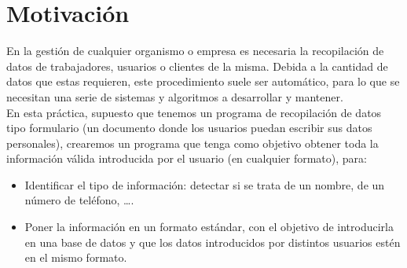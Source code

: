 \documentclass[12pt]{article}
\begin{document}

    
    

    \newpage




    \section{Motivación}
    En la gestión de cualquier organismo o empresa es necesaria la recopilación de datos de trabajadores, usuarios o clientes de la misma. Debida a la cantidad de datos que estas requieren, este procedimiento suele ser automático, para lo que se necesitan una serie de sistemas y algoritmos a desarrollar y mantener.\\

    En esta práctica, supuesto que tenemos un programa de recopilación de datos tipo formulario (un documento donde los usuarios puedan escribir sus datos personales), crearemos un programa que tenga como objetivo obtener toda la información válida introducida por el usuario (en cualquier formato), para:
    \begin{itemize}
        \item Identificar el tipo de información: detectar si se trata de un nombre, de un número de teléfono, \ldots.
        \item Poner la información en un formato estándar, con el objetivo de introducirla en una base de datos y que los datos introducidos por distintos usuarios estén en el mismo formato. 
    \end{itemize}
\end{document}
